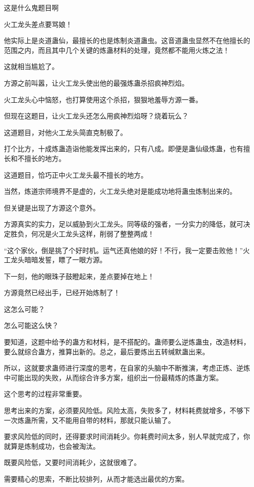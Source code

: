 \begin{this_body}
这是什么鬼题目啊

火工龙头差点要骂娘！

他实际上是炎道蛊仙，最擅长的也是炼制炎道蛊虫。这音道蛊虫显然不在他擅长的范围之内，而且其中几个关键的炼蛊材料的处理，竟然都不能用火炼之法！

这就相当尴尬了。

方源之前叫嚣，让火工龙头使出他的最强炼蛊杀招疯神烈焰。

火工龙头心中恼怒，也打算使用这个杀招，狠狠地羞辱方源一番。

但现在这题目，让火工龙头还怎么用疯神烈焰呀？烧着玩么？

这道题目，对他火工龙头简直克制极了。

打个比方，十成炼蛊造诣他能发挥出来的，只有八成。即便是蛊仙级炼蛊，也有擅长和不擅长的地方。

这道题目，恰巧正中火工龙头最不擅长的地方。

当然，炼道宗师境界不是虚的，火工龙头绝对是能成功地将蛊虫炼制出来的。

但关键是出现了方源这个意外。

方源真实的实力，足以威胁到火工龙头。同等级的强者，一分实力的降低，就可决定胜负，何况是火工龙头这样，削弱了整整两成！

“这个家伙，倒是挑了个好时机。运气还真他娘的好！不行，我一定要击败他！”火工龙头暗暗发誓，瞟了一眼方源。

下一刻，他的眼珠子鼓瞪起来，差点要掉在地上！

方源竟然已经出手，已经开始炼制了！

这怎么可能？

怎么可能这么快？

要知道，这题中给予的蛊方和材料，是不搭配的。蛊师要么逆炼蛊虫，改造材料，要么就综合蛊方，推算出新的。总之，最后要炼出五转缄默蛊出来。

所以，这就要求蛊师进行深度的思考，在自家的头脑中不断推演，考虑正炼、逆炼中可能出现的失败，从而综合许多方案，组织出一份最精炼的炼蛊方案。

这个思考的过程非常重要。

思考出来的方案，必须要风险低。风险太高，失败多了，材料耗费就增多，不够下一次炼蛊所需，又不能用自带的材料，那就只能认输了。

要求风险低的同时，还得要求时间消耗少。你耗费时间太多，别人早就完成了，你就算是炼制成功，也会被淘汰。

既要风险低，又要时间消耗少，这就很难了。

需要精心的思索，不断比较排列，从而才能选出最优的方案。


\end{this_body}

